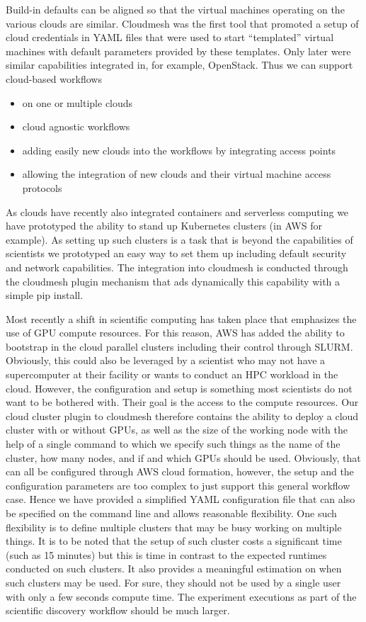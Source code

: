 \documentclass[utf8]{FrontiersinVancouver} %
\begin{document}
Build-in defaults can be aligned so that the virtual machines operating on the various clouds are similar.
Cloudmesh was the first tool that promoted a setup of cloud credentials in YAML files that were used to start ``templated'' virtual machines with default parameters provided by these templates. Only later were similar capabilities integrated in, for example,  OpenStack. Thus we can support cloud-based workflows

\begin{itemize}
    \item on one or multiple clouds
    \item cloud agnostic workflows
    \item adding easily new clouds into the workflows by integrating access points
    \item allowing the integration of new clouds and their virtual machine access protocols
\end{itemize}

As clouds have recently also integrated containers and serverless computing we have prototyped the ability to stand up Kubernetes clusters (in AWS for example). As setting up such clusters is a task that is beyond the capabilities of scientists we prototyped an easy way to set them up including default security and network capabilities. The integration into cloudmesh is conducted through the cloudmesh plugin mechanism that ads dynamically this capability with a simple pip install.

Most recently a shift in scientific computing has taken place that emphasizes the use of GPU compute resources. For this reason, AWS has added the ability to bootstrap in the cloud parallel clusters including their control through SLURM. Obviously, this could also be leveraged by a scientist who may not have a supercomputer at their facility or wants to conduct an HPC workload in the cloud. However, the configuration and setup is something most scientists do not want to be bothered with. Their goal is the access to the compute resources. Our cloud cluster plugin to cloudmesh therefore contains the ability to deploy a cloud cluster with or without GPUs, as well as the size of the working node with the help of a single command to which we specify such things as the name of the cluster, how many nodes, and if and which GPUs should be used. Obviously, that can all be configured through AWS cloud formation, however, the setup and the configuration parameters are too complex to just support this general workflow case. Hence we have provided a simplified YAML configuration file that can also be specified on the command line and allows reasonable flexibility. One such flexibility is to define multiple clusters that may be busy working on multiple things. It is to be noted that the setup of such cluster costs a significant time (such as 15 minutes) but this is time in contrast to the expected runtimes conducted on such clusters. It also provides a meaningful estimation on when such clusters may be used. For sure, they should not be used by a single user with only a few seconds compute time.  The experiment executions as part of the scientific discovery workflow should be much larger.
\end{document}
